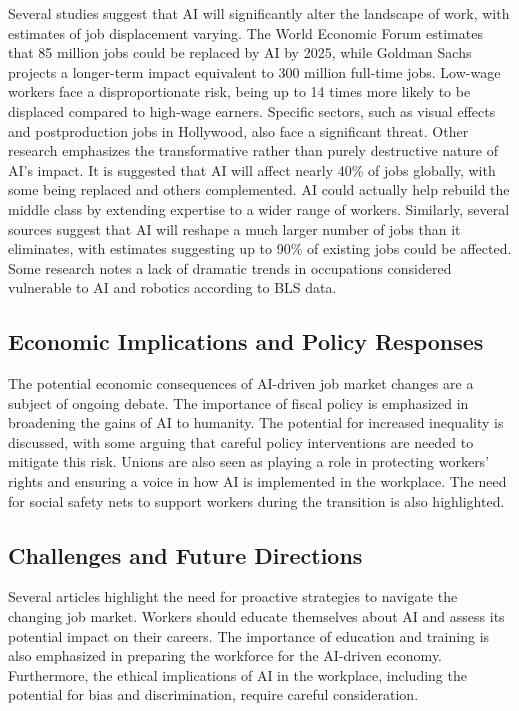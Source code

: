 \documentclass[a4paper,headinclude=on,footinclude=on,12pt,oneside]{scrbook}
\begin{document}
Several studies suggest that AI will significantly alter the landscape of work, with estimates of job displacement varying. The World Economic Forum estimates that 85 million jobs could be replaced by AI by 2025, while Goldman Sachs projects a longer-term impact equivalent to 300 million full-time jobs. Low-wage workers face a disproportionate risk, being up to 14 times more likely to be displaced compared to high-wage earners. Specific sectors, such as visual effects and postproduction jobs in Hollywood, also face a significant threat. Other research emphasizes the transformative rather than purely destructive nature of AI’s impact. It is suggested that AI will affect nearly 40\% of jobs globally, with some being replaced and others complemented. AI could actually help rebuild the middle class by extending expertise to a wider range of workers. Similarly, several sources suggest that AI will reshape a much larger number of jobs than it eliminates, with estimates suggesting up to 90\% of existing jobs could be affected. Some research notes a lack of dramatic trends in occupations considered vulnerable to AI and robotics according to BLS data.

\subsection*{Economic Implications and Policy Responses}

The potential economic consequences of AI-driven job market changes are a subject of ongoing debate. The importance of fiscal policy is emphasized in broadening the gains of AI to humanity. The potential for increased inequality is discussed, with some arguing that careful policy interventions are needed to mitigate this risk. Unions are also seen as playing a role in protecting workers’ rights and ensuring a voice in how AI is implemented in the workplace. The need for social safety nets to support workers during the transition is also highlighted.

\subsection*{Challenges and Future Directions}

Several articles highlight the need for proactive strategies to navigate the changing job market. Workers should educate themselves about AI and assess its potential impact on their careers. The importance of education and training is also emphasized in preparing the workforce for the AI-driven economy. Furthermore, the ethical implications of AI in the workplace, including the potential for bias and discrimination, require careful consideration.
\end{document}
